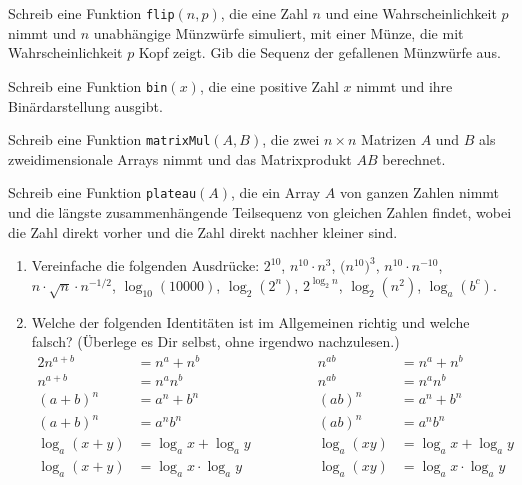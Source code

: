 \documentclass{uebung_cs}
\begin{document}
\begin{aufgabe}
    Schreib eine Funktion \texttt{flip}$(n,p)$, die eine Zahl $n$ und eine Wahrscheinlichkeit $p$ nimmt und $n$ unabhängige Münzwürfe simuliert, mit einer Münze, die mit Wahrscheinlichkeit $p$ Kopf zeigt. Gib die Sequenz der gefallenen Münzwürfe aus.
\end{aufgabe}

\begin{aufgabe}[Binärzahlen]
    Schreib eine Funktion \texttt{bin}$(x)$, die eine positive Zahl $x$ nimmt und ihre Binärdarstellung ausgibt.
\end{aufgabe}

\begin{aufgabe}[Matrixmultiplikation]
    Schreib eine Funktion \texttt{matrixMul}$(A,B)$, die zwei $n\times n$ Matrizen $A$ und $B$ als zweidimensionale Arrays nimmt und das Matrixprodukt $AB$ berechnet.
\end{aufgabe}

\begin{aufgabe}
    Schreib eine Funktion \texttt{plateau}$(A)$, die ein Array $A$ von ganzen Zahlen nimmt und die längste zusammenhängende Teilsequenz von gleichen Zahlen findet, wobei die Zahl direkt vorher und die Zahl direkt nachher kleiner sind.
\end{aufgabe}

\begin{aufgabe}\mbox{}
    \begin{enumerate}
        \item Vereinfache die folgenden Ausdrücke:
        $2^{10}$,\;
        $n^{10}\cdot n^{3}$,\;
        $\big(n^{10}\big)^{3}$,\;
        $n^{10} \cdot n^{-10}$,\;
        $n\cdot\sqrt{n}\cdot n^{-1/2}$,\;
        $\log_{10}(10000)$,\;
        $\log_2(2^n)$,\;
        $2^{\log_2 n}$,\;
        $\log_2(n^2)$,\;
        $\log_a(b^c)$.
        \item Welche der folgenden Identitäten ist im Allgemeinen richtig und welche falsch? (Überlege es Dir selbst, ohne irgendwo nachzulesen.)
        \begin{alignat*}{2}
            n^{a+b} &= n^a + n^b
            \qquad&\qquad
            n^{ab} &= n^a + n^b
            \\
            n^{a+b} &= n^a n^b
            \qquad&\qquad
            n^{ab} &= n^a n^b
            \\
            (a+b)^n &= a^n + b^n
            \qquad&\qquad
            (ab)^n &= a^n + b^n
            \\
            (a+b)^n &= a^n b^n
            \qquad&\qquad
            (ab)^n &= a^n b^n
            \\
            \log_a(x+y)&= \log_a x+ \log_a y
            \qquad&\qquad
            \log_a(xy)&= \log_a x+ \log_a y\\
            \log_a(x+y)&= \log_a x \cdot \log_a y
            \qquad&\qquad
            \log_a(xy)&= \log_a x\cdot \log_a y
        \end{alignat*}
    \end{enumerate}
\end{aufgabe}
\end{document}
